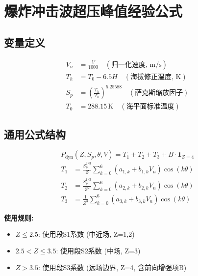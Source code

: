 
\section*{爆炸冲击波超压峰值经验公式}

\subsection*{变量定义}
\begin{align*}
  V_n &= \frac{V}{1000} \quad (\text{归一化速度, m/s}) \\
  T_h &= T_0 - 6.5H \quad (\text{海拔修正温度, K}) \\
  S_p &= \left(\frac{T_h}{T_0}\right)^{5.25588} \quad (\text{萨克斯缩放因子}) \\
  T_0 &= 288.15\,\mathrm{K} \quad (\text{海平面标准温度})
\end{align*}

\subsection*{通用公式结构}
\begin{equation}
  P_{\mathrm{dyn}}(Z, S_p, \theta, V) = T_1 + T_2 + T_3 + B \cdot \mathbf{1}_{Z=4}
\end{equation}
\begin{align*}
  T_1 &= \frac{S_p^{2/3}}{Z} \sum_{k=0}^{6} (a_{1,k} + b_{1,k} V_n) \cos(k\theta) \\
  T_2 &= \frac{S_p^{1/3}}{Z^2} \sum_{k=0}^{6} (a_{2,k} + b_{2,k} V_n) \cos(k\theta) \\
  T_3 &= \frac{1}{Z^3} \sum_{k=0}^{6} (a_{3,k} + b_{3,k} V_n) \cos(k\theta)
\end{align*}

\textbf{使用规则:}
\begin{itemize}
  \item $Z \leq 2.5$: 使用段S1系数 (中近场, Z=1,2)
  \item $2.5 < Z \leq 3.5$: 使用段S2系数 (中场, Z=3)
  \item $Z > 3.5$: 使用段S3系数 (远场边界, Z=4, 含前向增强项B)
\end{itemize}

